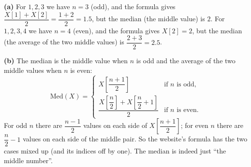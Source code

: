 \textbf{(a)} For $1,2,3$ we have $n=3$ (odd), and the formula gives $\dfrac{X[1]+X[2]}{2}=\dfrac{1+2}{2}=1.5$, but the median (the middle value) is $2$. For $1,2,3,4$ we have $n=4$ (even), and the formula gives $X[2]=2$, but the median (the average of the two middle values) is $\dfrac{2+3}{2}=2.5$.

\textbf{(b)} The median is the middle value when $n$ is odd and the average of the two middle values when $n$ is even:
\[\mathrm{Med}(X)=\begin{cases}X\left[\dfrac{n+1}{2}\right]&\text{if }n\text{ is odd,}\\[2ex]\dfrac{X\left[\dfrac n2\right]+X\left[\dfrac n2+1\right]}{2}&\text{if }n\text{ is even.}\end{cases}\]
For odd $n$ there are $\dfrac{n-1}{2}$ values on each side of $X\left[\dfrac{n+1}{2}\right]$; for even $n$ there are $\dfrac n2-1$ values on each side of the middle pair. So the website's formula has the two cases mixed up (and its indices off by one). The median is indeed just ``the middle number''.
